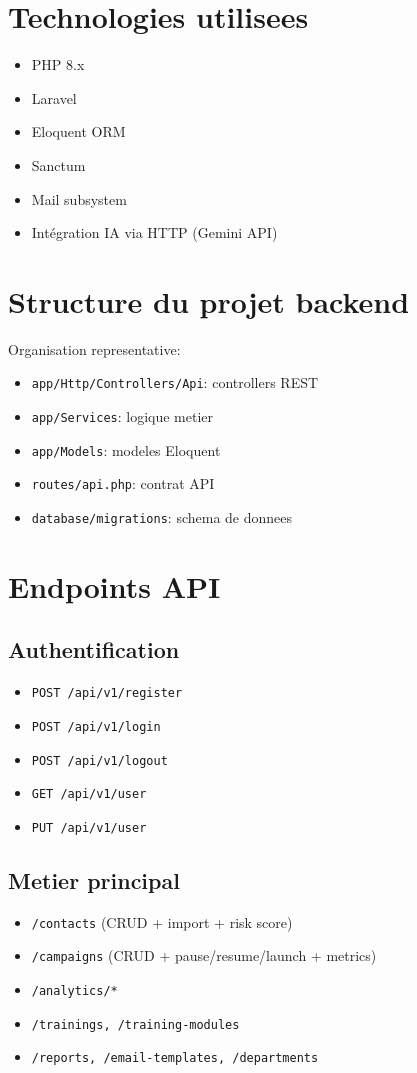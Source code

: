 \documentclass[12pt,a4paper,oneside]{report}
\begin{document}
\section{Technologies utilisees}
\begin{itemize}[leftmargin=1.2cm]
  \item PHP 8.x
  \item Laravel
  \item Eloquent ORM
  \item Sanctum
  \item Mail subsystem
  \item Intégration IA via HTTP (Gemini API)
\end{itemize}

\section{Structure du projet backend}
Organisation representative:
\begin{itemize}[leftmargin=1.2cm]
  \item \texttt{app/Http/Controllers/Api}: controllers REST
  \item \texttt{app/Services}: logique metier
  \item \texttt{app/Models}: modeles Eloquent
  \item \texttt{routes/api.php}: contrat API
  \item \texttt{database/migrations}: schema de donnees
\end{itemize}

\section{Endpoints API}
\subsection{Authentification}
\begin{itemize}[leftmargin=1.2cm]
  \item \texttt{POST /api/v1/register}
  \item \texttt{POST /api/v1/login}
  \item \texttt{POST /api/v1/logout}
  \item \texttt{GET /api/v1/user}
  \item \texttt{PUT /api/v1/user}
\end{itemize}

\subsection{Metier principal}
\begin{itemize}[leftmargin=1.2cm]
  \item \texttt{/contacts} (CRUD + import + risk score)
  \item \texttt{/campaigns} (CRUD + pause/resume/launch + metrics)
  \item \texttt{/analytics/*}
  \item \texttt{/trainings, /training-modules}
  \item \texttt{/reports, /email-templates, /departments}
\end{itemize}
\end{document}
